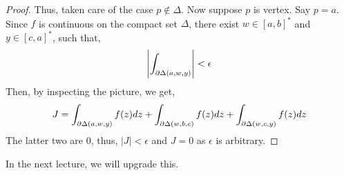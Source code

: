\documentclass[12pt]{amsart}
\begin{document}
\begin{proof}
    Thus, taken care of the case $p \not \in \Delta$. Now suppose $p$ is vertex. Say $p = a$. Since $f$ is continuous on the compact set $\Delta$, there exist $w \in [a,b]^*$ and $y \in [c,a]^*$, such that, 
    \begin{align*}
        \left|\int_{\partial\Delta(a,w,y)}\right| < \epsilon
    \end{align*}
    Then, by inspecting the picture, we get,
    \begin{align*}
        J = \int_{\partial\Delta(a, w, y)} f(z)dz + \int_{\partial \Delta(w, b, c)} f(z)dz + \int_{\partial\Delta(w, c, y)} f(z)dz 
    \end{align*}
    The latter two are $0$, thus, $|J| < \epsilon$ and $J = 0$ as $\epsilon$ is arbitrary. 
\end{proof}

In the next lecture, we will upgrade this. 
\end{document}
